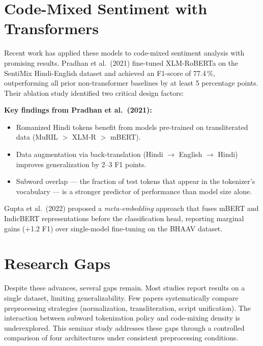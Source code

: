 \documentclass[12pt,a4paper]{report}
\newenvironment{rvsummary}
  {\par\vspace{6pt}\noindent\begin{tcolorbox}[
    colback=accent!5,
    colframe=accent!30,
    boxrule=0.5pt,
    arc=4pt,
    left=10pt,
    right=10pt,
    top=8pt,
    bottom=8pt,
  ]\small}
  {\end{tcolorbox}\vspace{4pt}}
\begin{document}
\section{Code-Mixed Sentiment with Transformers}

Recent work has applied these models to code-mixed sentiment analysis with promising results. Pradhan et al.\ (2021) \cite{pradhan2021} fine-tuned XLM-RoBERTa on the SentiMix Hindi-English dataset and achieved an F1-score of 77.4\,\%, outperforming all prior non-transformer baselines by at least 5 percentage points. Their ablation study identified two critical design factors:

\begin{rvsummary}
\textbf{Key findings from Pradhan et al.\ (2021):}
\begin{itemize}
  \item Romanized Hindi tokens benefit from models pre-trained on transliterated data (MuRIL $>$ XLM-R $>$ mBERT).
  \item Data augmentation via back-translation (Hindi $\rightarrow$ English $\rightarrow$ Hindi) improves generalization by 2--3 F1 points.
  \item Subword overlap — the fraction of test tokens that appear in the tokenizer's vocabulary — is a stronger predictor of performance than model size alone.
\end{itemize}
\end{rvsummary}

Gupta et al.\ (2022) \cite{gupta2022} proposed a \emph{meta-embedding} approach that fuses mBERT and IndicBERT representations before the classification head, reporting marginal gains (+1.2 F1) over single-model fine-tuning on the BHAAV dataset.

\section{Research Gaps}

Despite these advances, several gaps remain. Most studies report results on a single dataset, limiting generalizability. Few papers systematically compare preprocessing strategies (normalization, transliteration, script unification). The interaction between subword tokenization policy and code-mixing density is underexplored. This seminar study addresses these gaps through a controlled comparison of four architectures under consistent preprocessing conditions.

\end{document}

